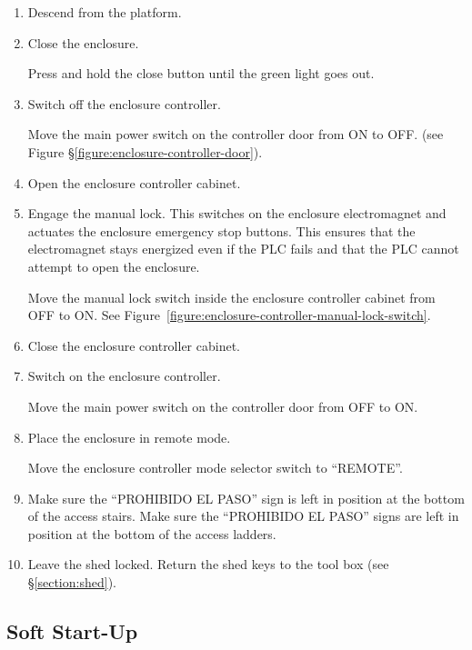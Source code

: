 \begin{enumerate}
\fi

\item
Descend from the platform.

\item 
Close the enclosure.

Press and hold the close button until the green light goes out.

\item
Switch off the enclosure controller.

Move the main power switch on the controller door from ON to OFF. (see Figure \S\ref{figure:enclosure-controller-door}).
\item
Open the enclosure controller cabinet.

\item
Engage the manual lock. This switches on the enclosure electromagnet and actuates the enclosure emergency stop buttons. This ensures that the electromagnet stays energized even if the PLC fails and that the PLC cannot attempt to open the enclosure.

Move the manual lock switch inside the enclosure controller cabinet from OFF to ON. See Figure~\ref{figure:enclosure-controller-manual-lock-switch}.

\item
Close the enclosure controller cabinet.

\item
Switch on the enclosure controller.

Move the main power switch on the controller door from OFF to ON.

\item
Place the enclosure in remote mode.

Move the enclosure controller mode selector switch to “REMOTE”.

\item
\ifcoatlioan
Make sure the “PROHIBIDO EL PASO” sign is left in position at the bottom of the access stairs.
\fi
\ifddotioan
Make sure the “PROHIBIDO EL PASO” signs are left in position at the bottom of the access ladders.
\fi

\item
Leave the shed locked. Return the shed keys to the tool box (see \S\ref{section:shed}).

\end{enumerate}

\subsection{Soft Start-Up}
\label{section:soft-start-up}

